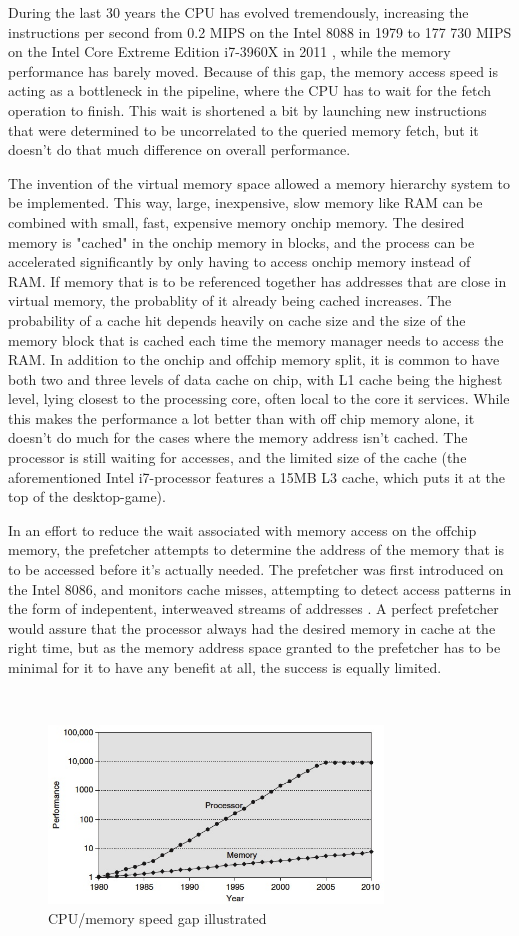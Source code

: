 During the last 30 years the CPU has evolved tremendously, increasing the instructions per second from 0.2 MIPS on the Intel 8088 in 1979\cite{reference:intel} to 177 730 MIPS on the Intel Core Extreme Edition i7-3960X in 2011 \cite{reference:inteli7}, while the memory performance has barely moved. Because of this gap, the memory access speed is acting as a bottleneck in the pipeline, where the CPU has to wait for the fetch operation to finish. This wait is shortened a bit by launching new instructions that were determined to be uncorrelated to the queried memory fetch, but it doesn't do that much difference on overall performance.

The invention of the virtual memory space allowed a memory hierarchy system to be implemented. This way, large, inexpensive, slow memory like RAM can be combined with small, fast, expensive memory onchip memory. The desired memory is "cached" in the onchip memory in blocks, and the process can be accelerated significantly by only having to access onchip memory instead of RAM. If memory that is to be referenced together has addresses that are close in virtual memory, the probablity of it already being cached increases. The probability of a cache hit depends heavily on cache size and the size of the memory block that is cached each time the memory manager needs to access the RAM. In addition to the onchip and offchip memory split, it is common to have both two and three levels of data cache on chip, with L1 cache being the highest level, lying closest to the processing core, often local to the core it services. While this makes the performance a lot better than with off chip memory alone, it doesn't do much for the cases where the memory address isn't cached. The processor is still waiting for accesses, and the limited size of the cache (the aforementioned Intel i7-processor features a 15MB L3 cache, which puts it at the top of the desktop-game). 

In an effort to reduce the wait associated with memory access on the offchip memory, the prefetcher attempts to determine the address of the memory that is to be accessed before it's actually needed. The prefetcher was first introduced on the Intel 8086, and monitors cache misses, attempting to detect access patterns in the form of indepentent, interweaved streams of addresses \cite{reference:8086}. A perfect prefetcher would assure that the processor always had the desired memory in cache at the right time, but as the memory address space granted to the prefetcher has to be minimal for it to have any benefit at all, the success is equally limited. 



\\
\begin{figure}[h!]
	\includegraphics[width=3.5in]{graphics/CPUmemoryGap.jpg}
	\caption{CPU/memory speed gap illustrated}
	\label{graph:cpugap}
\end{figure}
\\
